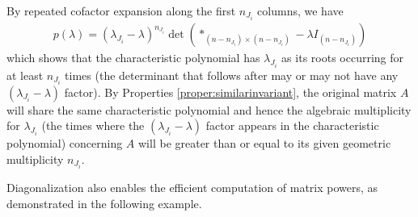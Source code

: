 By repeated cofactor expansion along the first $n_{J_i}$ columns, we have
\begin{align*}
p(\lambda) = (\lambda_{J_i}-\lambda)^{n_{J_i}} \det(*_{(n-n_{J_i})\times(n-n_{J_i})}-\lambda I_{(n-n_{J_i})})
\end{align*}
which shows that the characteristic polynomial has $\lambda_{J_i}$ as its roots occurring for at least $n_{J_i}$ times (the determinant that follows after may or may not have any $(\lambda_{J_i}-\lambda)$ factor). By Properties \ref{proper:similarinvariant}, the original matrix $A$ will share the same characteristic polynomial and hence the algebraic multiplicity for $\lambda_{J_i}$ (the times where the $(\lambda_{J_i}-\lambda)$ factor appears in the characteristic polynomial) concerning $A$ will be greater than or equal to its given geometric multiplicity $n_{J_i}$.\par

Diagonalization also enables the efficient computation of matrix powers, as demonstrated in the following example.


